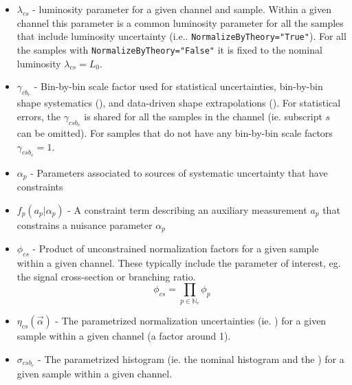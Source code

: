 \begin{itemize}
\item $ \lambda_{cs}$ - luminosity parameter for a given channel and sample.  Within a given channel this parameter is a common luminosity parameter for all the samples that include luminosity uncertainty (i.e.. \texttt{NormalizeByTheory="True"}).  For all the samples with  \texttt{NormalizeByTheory="False"} it is fixed to the nominal luminosity $\lambda_{cs}=L_0$.
\item $\gamma_{cb_e}$ - Bin-by-bin scale factor used for statistical uncertainties, bin-by-bin shape systematics (\SS), and data-driven shape extrapolations (\SF).  For statistical errors, the $\gamma_{csb_e}$ is shared for all the samples in the channel (ie. subscript $s$ can be omitted).  For samples that do not have any bin-by-bin scale factors $\gamma_{csb_e}=1$.
\item $\alpha_p$ - Parameters associated to sources of systematic uncertainty that have constraints
\item $f_p(a_p|\alpha_p)$ - A constraint term describing an auxiliary measurement $a_p$ that constrains a nuisance parameter $\alpha_p$
\item $ \phi_{cs}$ - Product of unconstrained normalization factors for a given sample within a given channel.  These typically include the parameter of interest, eg. the signal cross-section or branching ratio.
 \begin{equation}
 \phi_{cs}= \prod_{p\in\mathbb{N}_c} \phi_p
 \end{equation}
\item $\eta_{cs}(\vec\alpha)$  - The parametrized normalization uncertainties (ie. \OS) for a given sample within a given channel (a factor around 1).
\item $\sigma_{csb_e}$  - The parametrized histogram (ie. the nominal histogram and the \HS) for a given sample within a given channel.
\end{itemize}




